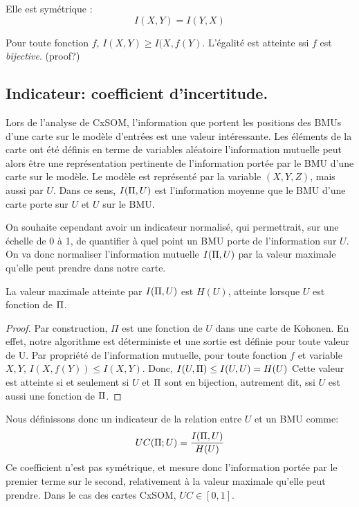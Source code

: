 Elle est symétrique : $$I(X,Y) = I(Y,X)$$

Pour toute fonction $f$, $I(X,Y) \geq I(X,f(Y)$. L'égalité est atteinte ssi $f$ est \emph{bijective}. (proof?)

\subsection{Indicateur: coefficient d'incertitude.}

Lors de l'analyse de CxSOM, l'information que portent les positions des BMUs d'une carte sur le modèle d'entrées est une valeur intéressante. Les éléments de la carte ont été définis en terme de variables aléatoire l'information mutuelle peut alors être une représentation pertinente de l'information portée par le BMU d'une carte sur le modèle. Le modèle est représenté par la variable $(X,Y,Z)$, mais aussi par $U$. Dans ce sens, $I(\Pi, U)$ est l'information moyenne que le BMU d'une carte porte sur $U$ et $U$ sur le BMU.

On souhaite cependant avoir un indicateur normalisé, qui permettrait, sur une échelle de 0 à 1, de quantifier à quel point un BMU porte de l'information sur $U$. On va donc normaliser l'information mutuelle $I(\Pi,U)$ par la valeur maximale qu'elle peut prendre dans notre carte.

\begin{propriete}
La valeur maximale atteinte par $I(\Pi,U)$ est $H(U)$, atteinte lorsque $U$ est fonction de $\Pi$.
\end{propriete}

\begin{proof}
Par construction, $\Pi$ est une fonction de $U$ dans une carte de Kohonen. En effet, notre algorithme est déterministe et une sortie est définie pour toute valeur de U. 
Par propriété de l'information mutuelle, pour toute fonction $f$ et variable $X,Y$, $I(X,f(Y)) \leq I(X,Y) $.
Donc, $I(U,\Pi) \leq I(U,U) = H(U)$
Cette valeur est atteinte si et seulement si $U$ et $\Pi$ sont en bijection, autrement dit, ssi $U$ est aussi une fonction de $\Pi$.

\end{proof}

Nous définissons donc un indicateur de la relation entre $U$ et un BMU comme:
\begin{equation}
UC(\Pi;U) = \frac{I(\Pi,U)}{H(U)}
\end{equation}
Ce coefficient n'est pas symétrique, et mesure donc l'information portée par le premier terme sur le second, relativement à la valeur maximale qu'elle peut prendre. Dans le cas des cartes CxSOM, $UC \in [0,1]$. 

